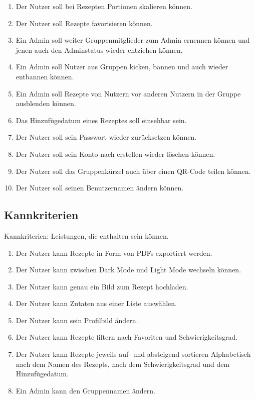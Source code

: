 \documentclass[parskip=full]{scrartcl}
\begin{document}
\begin{enumerate}[start=1,label={$\langle$\bfseries RS\arabic*$\rangle$}, leftmargin = 5em, itemsep=4pt, parsep=4pt]
    
    \item Der Nutzer soll bei Rezepten Portionen skalieren können.\label{RS1}
    \item Der Nutzer soll Rezepte favorisieren können.\label{RS2}
    \item Ein Admin soll weiter Gruppenmitglieder zum Admin ernennen können und jenen auch den Adminstatus wieder entziehen können.\label{RS3}
    \item Ein Admin soll Nutzer aus Gruppen kicken, bannen und auch wieder entbannen können.\label{RS4}
    \item Ein Admin soll Rezepte von Nutzern vor anderen Nutzern in der Gruppe ausblenden können.\label{RS5}
    \item Das Hinzufügedatum eines Rezeptes soll einsehbar sein.\label{RS7}
    \item Der Nutzer soll sein Passwort wieder zurücksetzen können.\label{RS8}
    \item Der Nutzer soll sein Konto nach erstellen wieder löschen können.\label{RS9}
    \item Der Nutzer soll das Gruppenkürzel auch über einen QR-Code teilen können.\label{RS10}
    \item Der Nutzer soll seinen Benutzernamen ändern können.\label{RS11}
\end{enumerate}

\subsection{Kannkriterien}
Kannkriterien: Leistungen, die enthalten sein können.

\begin{enumerate}[start=1,label={$\langle$\bfseries RC\arabic*$\rangle$}, leftmargin = 5em, itemsep=4pt, parsep=4pt]
    \item Der Nutzer kann Rezepte in Form von PDFs exportiert werden.\label{RC1}
    \item Der Nutzer kann zwischen Dark Mode und Light Mode wechseln können.\label{RC2}
    \item Der Nutzer kann genau ein Bild zum Rezept hochladen.\label{RC3}
    \item Der Nutzer kann Zutaten aus einer Liste auswählen.\label{RC4}
    \item Der Nutzer kann sein Profilbild ändern.\label{RC5}
    \item Der Nutzer kann Rezepte filtern nach Favoriten und Schwierigkeitsgrad.\label{RC6}
    \item Der Nutzer kann Rezepte jeweils auf- und absteigend sortieren Alphabetisch nach dem Namen des Rezepts, nach dem Schwierigkeitsgrad und dem Hinzufügedatum.\label{RC7}
    \item Ein Admin kann den Gruppennamen ändern.\label{RC8}
\end{enumerate}
\end{document}
